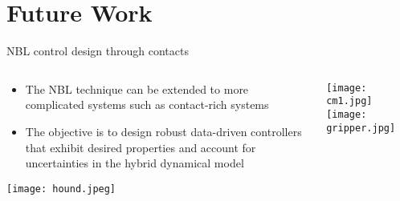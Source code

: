 \section{Future Work}

\begin{frame}{NBL control design through contacts}
    \small
    \begin{columns}
    \begin{column}{0.5\linewidth}
        \begin{itemize}
            \item The NBL technique can be extended to more complicated systems
            such as contact-rich systems
            \item The objective is to design robust data-driven controllers that
            exhibit desired properties and account for uncertainties in the hybrid
            dynamical model
        \end{itemize}
        \texttt{[image: hound.jpeg]}
    \end{column}
    \begin{column}[t]{0.5\linewidth}
        \texttt{[image: cm1.jpg]}
        \texttt{[image: gripper.jpg]}
    \end{column}
    \end{columns}
\end{frame}

